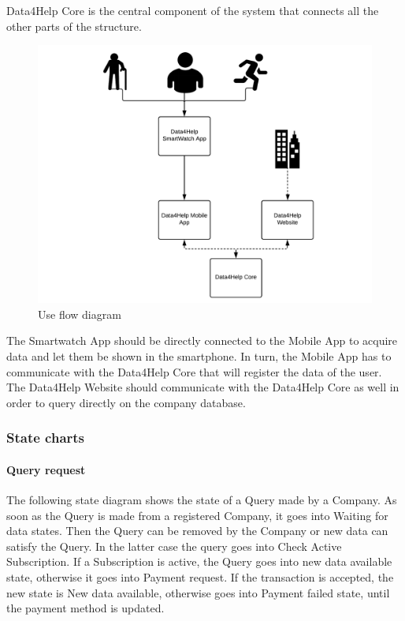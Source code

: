 Data4Help Core is the central component of the system that connects all the other parts of the structure.

\begin{figure}[H]
	\includegraphics[width=\textwidth,height=\textheight,keepaspectratio]{assets/useflow.pdf}
	\caption{Use flow diagram}
	\label{fig:useflow}
\end{figure}

The Smartwatch App should be directly connected to the Mobile App to acquire data and let them be shown in the smartphone. In turn, the Mobile App has to communicate with the Data4Help Core that will register the data of the user. The Data4Help Website should communicate with the Data4Help Core as well in order to query directly on the company database.
\newline

\subsubsection{State charts}

\paragraph{Query request}
The following state diagram shows the state of a Query made by a Company. As soon as the Query is made from a registered Company, it goes into Waiting for data states. Then the Query can be removed by the Company or new data can satisfy the Query. In the latter case the query goes into Check Active Subscription. If a Subscription is active, the Query goes into new data available state, otherwise it goes into Payment request. If the transaction is accepted, the new state is New data available, otherwise goes into Payment failed state, until the payment method is updated.

